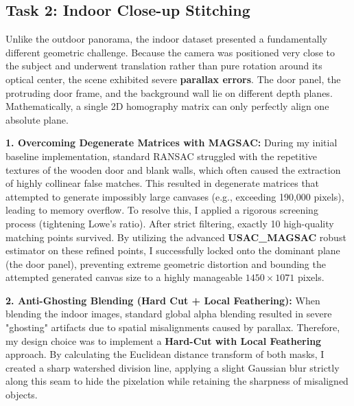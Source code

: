 \documentclass{Resources/UoBLab1}
\begin{document}
    \subsection{Task 2: Indoor Close-up Stitching}

    Unlike the outdoor panorama, the indoor dataset presented a fundamentally
    different geometric challenge. Because the camera was positioned very close to
    the subject and underwent translation rather than pure rotation around its optical
    center, the scene exhibited severe \textbf{parallax errors}. The door panel,
    the protruding door frame, and the background wall lie on different depth
    planes. Mathematically, a single 2D homography matrix can only perfectly
    align one absolute plane.

    \textbf{1. Overcoming Degenerate Matrices with MAGSAC:} During my initial baseline
    implementation, standard RANSAC struggled with the repetitive textures of
    the wooden door and blank walls, which often caused the extraction of highly
    collinear false matches. This resulted in degenerate matrices that attempted
    to generate impossibly large canvases (e.g., exceeding 190,000 pixels), leading
    to memory overflow. To resolve this, I applied a rigorous screening process (tightening
    Lowe's ratio). After strict filtering, exactly 10 high-quality matching points
    survived. By utilizing the advanced \textbf{USAC\_MAGSAC} robust estimator on
    these refined points, I successfully locked onto the dominant plane (the door
    panel), preventing extreme geometric distortion and bounding the attempted generated
    canvas size to a highly manageable $1450 \times 1071$ pixels.

    \textbf{2. Anti-Ghosting Blending (Hard Cut + Local Feathering):} When
    blending the indoor images, standard global alpha blending resulted in severe
    "ghosting" artifacts due to spatial misalignments caused by parallax.
    Therefore, my design choice was to implement a \textbf{Hard-Cut with Local
    Feathering} approach. By calculating the Euclidean distance transform of both
    masks, I created a sharp watershed division line, applying a slight Gaussian
    blur strictly along this seam to hide the pixelation while retaining the sharpness
    of misaligned objects.
\end{document}
